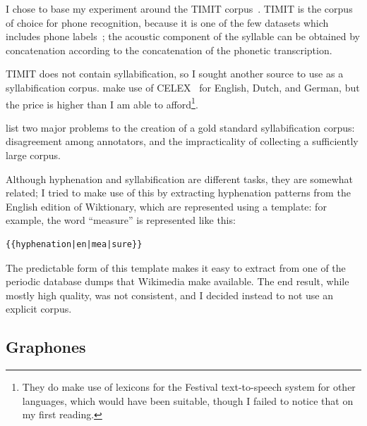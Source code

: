 \documentclass{article}[11pt]
\begin{document}
I chose to base my experiment around the TIMIT corpus~\citep{garofolo_john_s_timit_nodate}.
TIMIT is the corpus of choice for phone recognition, because it is one of the few datasets which includes phone labels~\citep{lopes_phoneme_2011}; the acoustic component of the syllable can be obtained by concatenation according to the concatenation of the phonetic transcription.

TIMIT does not contain syllabification, so I sought another source to use as a syllabification corpus. \citet{krantz_language-agnostic_2019} make use of CELEX~\citep{baayen_r_h_celex2_1995} for English, Dutch, and German, but the price is higher than I am able to afford\footnote{They do make use of lexicons for the Festival text-to-speech system for other languages, which would have been suitable, though I failed to notice that on my first reading.}.

\citet{marchand_automatic_2009} list two major problems to the creation of a gold standard syllabification corpus: disagreement among annotators, and the impracticality of collecting a sufficiently large corpus.

Although hyphenation and syllabification are different tasks, they are somewhat related; I tried to make use of this by extracting hyphenation patterns from the English edition of Wiktionary, which are represented using a template: for example, the word ``measure'' is represented like this:

\begin{verbatim}
{{hyphenation|en|mea|sure}}
\end{verbatim}

The predictable form of this template makes it easy to extract from one of the periodic database dumps that Wikimedia make available. The end result, while mostly high quality, was not consistent, and I decided instead to not use an explicit corpus.

\subsection{Graphones}
\label{ssect:graphones}
\end{document}
